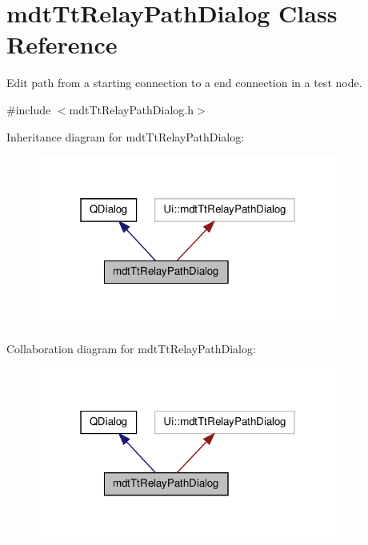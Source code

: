\hypertarget{classmdt_tt_relay_path_dialog}{\section{mdt\-Tt\-Relay\-Path\-Dialog Class Reference}
\label{classmdt_tt_relay_path_dialog}
}


Edit path from a starting connection to a end connection in a test node.  




{\ttfamily \#include $<$mdt\-Tt\-Relay\-Path\-Dialog.\-h$>$}



Inheritance diagram for mdt\-Tt\-Relay\-Path\-Dialog\-:
\nopagebreak
\begin{figure}[H]
\begin{center}
\leavevmode
\includegraphics[width=280pt]{classmdt_tt_relay_path_dialog__inherit__graph}
\end{center}
\end{figure}


Collaboration diagram for mdt\-Tt\-Relay\-Path\-Dialog\-:
\nopagebreak
\begin{figure}[H]
\begin{center}
\leavevmode
\includegraphics[width=280pt]{classmdt_tt_relay_path_dialog__coll__graph}
\end{center}
\end{figure}
